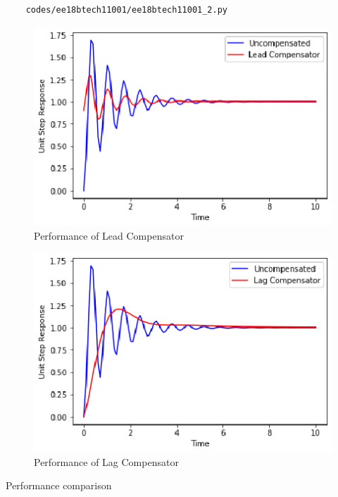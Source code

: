 \begin{lstlisting}
    codes/ee18btech11001/ee18btech11001_2.py
\end{lstlisting}

\begin{figure}[!ht]
\centering
    \includegraphics[width=\columnwidth]{./figs/ee18btech11001/ee18btech11001_4.eps}
  \caption{Performance of Lead Compensator}
  \label{fig:ee18btech11001_fig4}
\end{figure}


\begin{figure}[!ht]
\centering
    \includegraphics[width=\columnwidth]{./figs/ee18btech11001/ee18btech11001_5.eps}
  \caption{Performance of Lag Compensator}
  \label{fig:ee18btech11001_fig5}
\end{figure}






\begin{table}[!ht]
\centering

\caption{Performance comparison}
\label{table:ee18btech11001_2}
\end{table}


